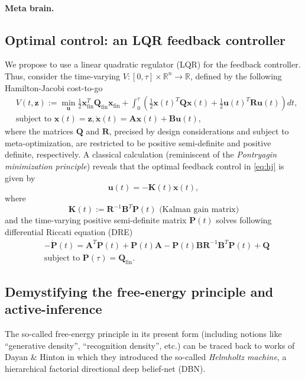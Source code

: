 \documentclass{article} %
\def\B#1{\bm{#1}}
\newcommand{\R}{\mathbb{R}}
\def\u{\mathbf{u}}
\def\z{\mathbf{z}}
\def\A{\mathbf{A}}
\def\B{\mathbf{B}}
\def\R{\mathbf{R}}
\def\Q{\mathbf{Q}}
\def\P{\mathbf{P}}
\def\K{\mathbf{K}}
\def\x{\mathbf{x}}
\begin{document}
\paragraph{Meta brain.}

\subsection{Optimal control: an LQR feedback controller}
We propose to use a linear quadratic regulator (LQR) for the feedback controller. Thus, consider the time-varying  $V: [0, \tau] \times \mathbb R^n \rightarrow \mathbb R$, defined by the following Hamilton-Jacobi cost-to-go
\begin{equation}
  \begin{split}
    &V(t, \z) := \min_{\u} \frac{1}{2}\x_{\text{fin}}^T\Q_{\text{fin}}\x_{\text{fin}} + \int_{0}^\tau\left(\frac{1}{2}\x(t)^T\Q\x(t) + \frac{1}{2}\u(t)^T\R\u(t)\right)dt,\\
    &\text{subject to } \x(t) = \z, \dot{\x}(t) = \A\x(t) + \B\u(t),
  \end{split}
  \label{eq:hj}
\end{equation}
where the matrices $\Q$ and $\R$, precised by design considerations and subject to meta-optimization, are restricted to be positive semi-definite and positive definite, respectively. A classical calculation (reminiscent of the \textit{Pontryagin minimization principle}) reveals that the optimal feedback control in \eqref{eq:hj} is given by
\begin{equation}
  \u(t) = -\K(t)\x(t),
\end{equation}
where
\begin{equation}
  \K(t) := \R^{-1}\B^T\P(t)\text{ (Kalman gain matrix)}
\end{equation}
and the time-varying positive semi-definite matrix $\P(t)$ solves following differential Riccati equation (DRE)
\begin{equation}
\begin{split}
&-\dot{\P}(t) = \A^T\P(t) + \P(t)\A - \P(t)\B\R^{-1}\B^T\P(t) + \Q\\
&\text{subject to }\P(\tau) = \Q_{\text{fin}}.
\end{split}
\end{equation}

\subsection{Demystifying the free-energy principle and active-inference}
The so-called free-energy principle in its present form (including notions like ``generative density'', ``recognition density'', etc.) can be traced back to works of Dayan \& Hinton \citep{dayan1995helmholtz} in which they introduced the so-called \textit{Helmholtz machine}, a hierarchical factorial directional deep belief-net (DBN).
\end{document}
